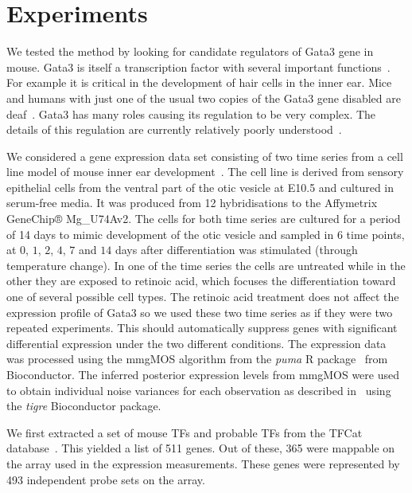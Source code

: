 \documentclass{article}
\begin{document}
\section{Experiments}


We tested the method by looking for candidate regulators of Gata3 gene
in  mouse.   Gata3  is  itself  a transcription  factor  with  several
important  functions~\cite{Chou2010}.  For example  it is  critical in
the development of hair cells in  the inner ear.  Mice and humans with
just  one of  the usual  two  copies of  the Gata3  gene disabled  are
deaf~\cite{Esch2000}.  Gata3 has many  roles causing its regulation to
be  very  complex.  The  details  of  this  regulation  are  currently
relatively poorly understood~\cite{Burch2005}.

We considered a gene expression data set consisting of two time series
from     a    cell     line     model    of     mouse    inner     ear
development~\cite{Helyer:model07}.   The  cell  line is  derived  from
sensory epithelial cells from the  ventral part of the otic vesicle at
E10.5  and cultured  in  serum-free  media. It  was  produced from  12
hybridisations to  the Affymetrix GeneChip® Mg\_U74Av2.  The cells for
both  time series  are  cultured for  a  period of  14  days to  mimic
development of  the otic  vesicle and sampled  in $6$ time  points, at
$0$,  $1$, $2$,  $4$,  $7$  and $14$  days  after differentiation  was
stimulated (through  temperature change).  In  one of the  time series
the  cells  are untreated  while  in the  other  they  are exposed  to
retinoic acid, which focuses the differentiation toward one of several
possible cell types.  The retinoic  acid treatment does not affect the
expression profile  of Gata3 so  we used these  two time series  as if
they  were  two   repeated  experiments.   This  should  automatically
suppress genes with significant  differential expression under the two
different  conditions.  The  expression data  was processed  using the
mmgMOS       algorithm        from       the       \emph{puma}       R
package~\cite{Liu:tractable04,Pearson:puma09}  from Bioconductor.  The
inferred posterior  expression levels from mmgMOS were  used to obtain
individual   noise  variances  for   each  observation   as  described
in~\cite{Honkela:modelbased10}  using  the  \emph{tigre}  Bioconductor
package. %

We first extracted a set of  mouse TFs and probable TFs from the TFCat
database~\cite{Fulton2009}.  This yielded a list of 511 genes.  Out of
these,  365  were  mappable  on  the  array  used  in  the  expression
measurements.  These  genes were represented by  493 independent probe
sets on the array.
\end{document}
